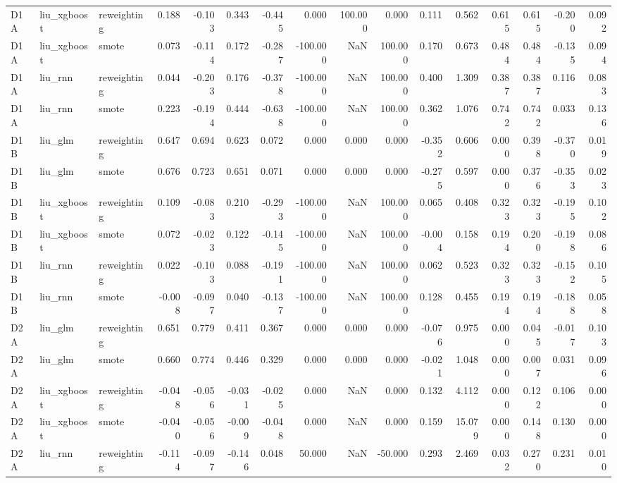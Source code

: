 \begin{tabular}{lllrrrrrrrrrrrrr}
D1A & liu_xgboost & reweighting & 0.188 & -0.103 & 0.343 & -0.445 & 0.000 & 100.000 & 0.000 & 0.111 & 0.562 & 0.615 & 0.615 & -0.200 & 0.092 \\
D1A & liu_xgboost & smote & 0.073 & -0.114 & 0.172 & -0.287 & -100.000 & NaN & 100.000 & 0.170 & 0.673 & 0.484 & 0.484 & -0.135 & 0.094 \\
D1A & liu_rnn & reweighting & 0.044 & -0.203 & 0.176 & -0.378 & -100.000 & NaN & 100.000 & 0.400 & 1.309 & 0.387 & 0.387 & 0.116 & 0.083 \\
D1A & liu_rnn & smote & 0.223 & -0.194 & 0.444 & -0.638 & -100.000 & NaN & 100.000 & 0.362 & 1.076 & 0.742 & 0.742 & 0.033 & 0.136 \\
D1B & liu_glm & reweighting & 0.647 & 0.694 & 0.623 & 0.072 & 0.000 & 0.000 & 0.000 & -0.352 & 0.606 & 0.000 & 0.398 & -0.370 & 0.019 \\
D1B & liu_glm & smote & 0.676 & 0.723 & 0.651 & 0.071 & 0.000 & 0.000 & 0.000 & -0.275 & 0.597 & 0.000 & 0.376 & -0.353 & 0.023 \\
D1B & liu_xgboost & reweighting & 0.109 & -0.083 & 0.210 & -0.293 & -100.000 & NaN & 100.000 & 0.065 & 0.408 & 0.323 & 0.323 & -0.195 & 0.102 \\
D1B & liu_xgboost & smote & 0.072 & -0.023 & 0.122 & -0.145 & -100.000 & NaN & 100.000 & -0.004 & 0.158 & 0.194 & 0.200 & -0.198 & 0.086 \\
D1B & liu_rnn & reweighting & 0.022 & -0.103 & 0.088 & -0.191 & -100.000 & NaN & 100.000 & 0.062 & 0.523 & 0.323 & 0.323 & -0.152 & 0.105 \\
D1B & liu_rnn & smote & -0.008 & -0.097 & 0.040 & -0.137 & -100.000 & NaN & 100.000 & 0.128 & 0.455 & 0.194 & 0.194 & -0.188 & 0.058 \\
D2A & liu_glm & reweighting & 0.651 & 0.779 & 0.411 & 0.367 & 0.000 & 0.000 & 0.000 & -0.076 & 0.975 & 0.000 & 0.045 & -0.017 & 0.103 \\
D2A & liu_glm & smote & 0.660 & 0.774 & 0.446 & 0.329 & 0.000 & 0.000 & 0.000 & -0.021 & 1.048 & 0.000 & 0.007 & 0.031 & 0.096 \\
D2A & liu_xgboost & reweighting & -0.048 & -0.056 & -0.031 & -0.025 & 0.000 & NaN & 0.000 & 0.132 & 4.112 & 0.000 & 0.122 & 0.106 & 0.000 \\
D2A & liu_xgboost & smote & -0.040 & -0.056 & -0.009 & -0.048 & 0.000 & NaN & 0.000 & 0.159 & 15.079 & 0.000 & 0.148 & 0.130 & 0.000 \\
D2A & liu_rnn & reweighting & -0.114 & -0.097 & -0.146 & 0.048 & 50.000 & NaN & -50.000 & 0.293 & 2.469 & 0.032 & 0.270 & 0.231 & 0.010 \\

\end{tabular}
